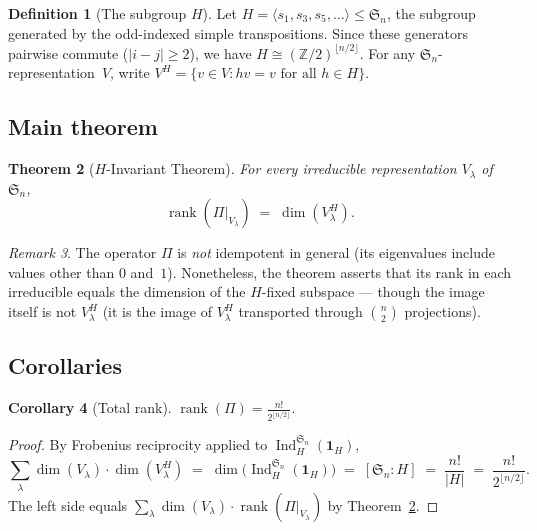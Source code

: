\documentclass[11pt]{article}
\newtheorem{theorem}{Theorem}[section]
\newtheorem{corollary}[theorem]{Corollary}
\theoremstyle{definition}
\newtheorem{definition}[theorem]{Definition}
\theoremstyle{remark}
\newtheorem{remark}[theorem]{Remark}
\newcommand{\ZZ}{\mathbb{Z}}
\newcommand{\Sym}{\mathfrak{S}}
\newcommand{\rk}{\operatorname{rank}}
\DeclareMathOperator{\Ind}{Ind}
\begin{document}
\begin{definition}[The subgroup $H$]
Let $H = \langle s_1, s_3, s_5, \ldots \rangle \le \Sym_n$, the subgroup
generated by the odd-indexed simple transpositions. Since these generators
pairwise commute ($|i - j| \ge 2$), we have
$H \cong (\ZZ/2)^{\lfloor n/2 \rfloor}$.
For any $\Sym_n$-representation~$V$, write
$V^H = \{v \in V : hv = v \text{ for all } h \in H\}$.
\end{definition}

\subsection{Main theorem}

\begin{theorem}[$H$-Invariant Theorem]\label{thm:main}
For every irreducible representation $V_\lambda$ of\/ $\Sym_n$,
\[
  \rk(\Pi|_{V_\lambda}) \;=\; \dim(V_\lambda^H).
\]
\end{theorem}

\begin{remark}
The operator $\Pi$ is \emph{not} idempotent in general (its eigenvalues
include values other than $0$ and~$1$). Nonetheless, the theorem
asserts that its rank in each irreducible equals the dimension of the
$H$-fixed subspace --- though the image itself is not $V_\lambda^H$
(it is the image of $V_\lambda^H$ transported through
$\binom{n}{2}$ projections).
\end{remark}

\subsection{Corollaries}

\begin{corollary}[Total rank]\label{cor:total-rank}
$\displaystyle \rk(\Pi) = \frac{n!}{2^{\lfloor n/2 \rfloor}}.$
\end{corollary}
\begin{proof}
By Frobenius reciprocity applied to $\Ind_H^{\Sym_n}(\mathbf{1}_H)$,
\[
  \sum_\lambda \dim(V_\lambda) \cdot \dim(V_\lambda^H)
  \;=\; \dim\bigl(\Ind_H^{\Sym_n}(\mathbf{1}_H)\bigr)
  \;=\; [\Sym_n : H]
  \;=\; \frac{n!}{|H|}
  \;=\; \frac{n!}{2^{\lfloor n/2 \rfloor}}.
\]
The left side equals $\sum_\lambda \dim(V_\lambda) \cdot \rk(\Pi|_{V_\lambda})$
by Theorem~\ref{thm:main}.
\end{proof}
\end{document}

